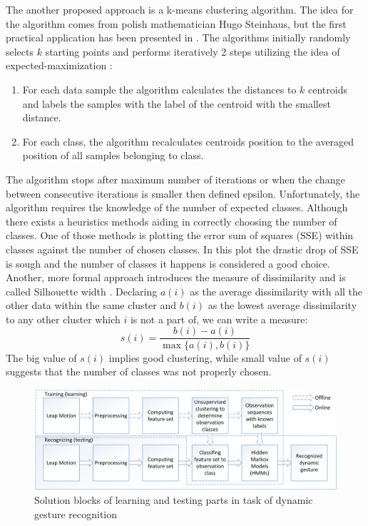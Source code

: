 The another proposed approach is a k-means clustering algorithm.
The idea for the algorithm comes from polish mathematician Hugo Steinhaus, but the first practical application has been presented in \cite{kmeans2}.
The algorithms initially randomly selects $k$ starting points and performs iteratively 2 steps utilizing the idea of expected-maximization \cite{expectedmaximization}:
\begin{enumerate}
\item For each data sample the algorithm calculates the distances to $k$ centroids and labels the samples with the label of the centroid with the smallest distance.
\item For each class, the algorithm recalculates centroids position to the averaged position of all samples belonging to class.
\end{enumerate} 
The algorithm stops after maximum number of iterations or when the change between consecutive iterations is smaller then defined epsilon.
Unfortunately, the algorithm requires the knowledge of the number of expected classes.
Although there exists a heuristics methods aiding in correctly choosing the number of classes. 
One of those methods is plotting the error sum of squares (SSE) within classes against the number of chosen classes. 
In this plot the drastic drop of SSE is sough and the number of classes it happens is considered a good choice.
Another, more formal approach introduces the measure of dissimilarity and is called Silhouette width \cite{silhouette}.
Declaring $a(i)$ as the average dissimilarity with all the other data within the same cluster and $b(i)$ as the lowest average dissimilarity to any other cluster which $i$ is not a part of, we can write a measure:
\begin{equation}
s(i) = \frac{b(i) - a(i)}{\max{\{a(i),b(i)}\}}
\end{equation}
The big value of $s(i)$ implies good clustering, while small value of $s(i)$ suggests that the number of classes was not properly chosen.





\begin{figure}[htb]
\centering
 \includegraphics[width=1\columnwidth]{figures/DynamicGestures.png}
 \caption{Solution blocks of learning and testing parts in task of dynamic gesture recognition}
 \label{dynamicgesturesflow}
\end{figure}

